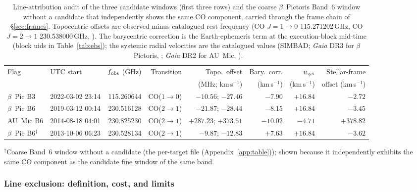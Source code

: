 \documentclass{openjournal}
\begin{document}
\begin{table}
\centering
\small
\caption{Line-attribution audit of the three candidate windows
(first three rows) and the coarse $\beta$~Pictoris Band~6 window
without a candidate
that independently shows the same CO component, carried through the
frame chain of \S\ref{sec:frames}. Topocentric offsets are observed
minus catalogued rest frequency (CO $J{=}1{\to}0$ 115.271202\,GHz,
CO $J{=}2{\to}1$ 230.538000\,GHz, \citealt{Pickett1998}). The
barycentric correction is the Earth-ephemeris term at the
execution-block mid-time (block uids in Table~\ref{tab:ebs}); the
systemic radial velocities are the catalogued values (SIMBAD;
\emph{Gaia} DR3 for $\beta$~Pictoris, \citealt{GaiaDR3}; \emph{Gaia}
DR2 for AU~Mic, \citealt{Fouque2018}).}
\label{tab:bpicaudit}
\begin{tabular}{@{}llrrrrrr@{}}
\toprule
Flag & UTC start & $f_{\rm obs}$ (GHz) &
Transition & Topo.\ offset & Bary.\ corr. & $v_{\rm sys}$ &
Stellar-frame \\
 & & & & (MHz; km\,s$^{-1}$) & (km\,s$^{-1}$) & (km\,s$^{-1}$) &
offset (km\,s$^{-1}$) \\
\midrule
$\beta$~Pic B3 & 2022-03-02 23:14 & 115.260644 &
CO($1{\to}0$) & $-10.56$; $-27.46$ & $-7.90$ & $+16.84$ & $-2.72$ \\
$\beta$~Pic B6 & 2019-03-12 00:14 & 230.516128 &
CO($2{\to}1$) & $-21.87$; $-28.44$ & $-8.15$ & $+16.84$ & $-3.45$ \\
AU~Mic B6 & 2014-08-18 04:01 & 230.825230 &
CO($2{\to}1$) & $+287.23$; $+373.51$ & $-10.02$ & $-4.71$ & $+378.82$ \\
$\beta$~Pic B6$^{\dagger}$ & 2013-10-06 06:23 & 230.528134 &
CO($2{\to}1$) & $-9.87$; $-12.83$ & $+7.63$ & $+16.84$ & $-3.62$ \\
\bottomrule
\end{tabular}
\parbox{\textwidth}{\footnotesize $^{\dagger}$Coarse
Band~6 window without a candidate (the per-target file (Appendix~\ref{app:table})); shown
because it independently exhibits the same CO component as the
candidate fine window of the same band.}
\end{table}

\subsubsection*{Line exclusion: definition, cost, and limits}
\end{document}
